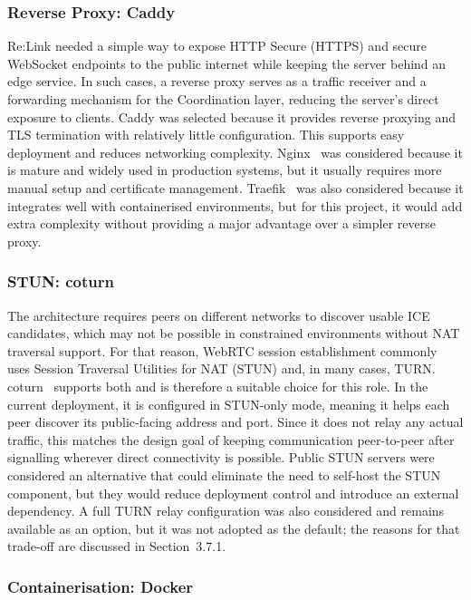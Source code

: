 \documentclass[12pt,a4paper,oneside]{report}
\begin{document}
\subsubsection{Reverse Proxy: Caddy}
\label{sec:reverse-proxy}

Re:Link needed a simple way to expose HTTP Secure (HTTPS) and secure WebSocket endpoints to the public internet while keeping the server behind an edge service. In such cases, a reverse proxy serves as a traffic receiver and a forwarding mechanism for the Coordination layer, reducing the server's direct exposure to clients. Caddy was selected because it provides reverse proxying and TLS termination with relatively little configuration. This supports easy deployment and reduces networking complexity. Nginx~\cite{nginx} was considered because it is mature and widely used in production systems, but it usually requires more manual setup and certificate management. Traefik~\cite{traefik} was also considered because it integrates well with containerised environments, but for this project, it would add extra complexity without providing a major advantage over a simpler reverse proxy.

\subsubsection{STUN: coturn}
\label{sec:stun-coturn}

The architecture requires peers on different networks to discover usable ICE candidates, which may not be possible in constrained environments without NAT traversal support. For that reason, WebRTC session establishment commonly uses Session Traversal Utilities for NAT (STUN) and, in many cases, TURN. coturn~\cite{coturn} supports both and is therefore a suitable choice for this role. In the current deployment, it is configured in STUN-only mode, meaning it helps each peer discover its public-facing address and port. Since it does not relay any actual traffic, this matches the design goal of keeping communication peer-to-peer after signalling wherever direct connectivity is possible. Public STUN servers were considered an alternative that could eliminate the need to self-host the STUN component, but they would reduce deployment control and introduce an external dependency. A full TURN relay configuration was also considered and remains available as an option, but it was not adopted as the default; the reasons for that trade-off are discussed in Section~3.7.1.

\subsubsection{Containerisation: Docker}
\label{sec:docker}
\end{document}
